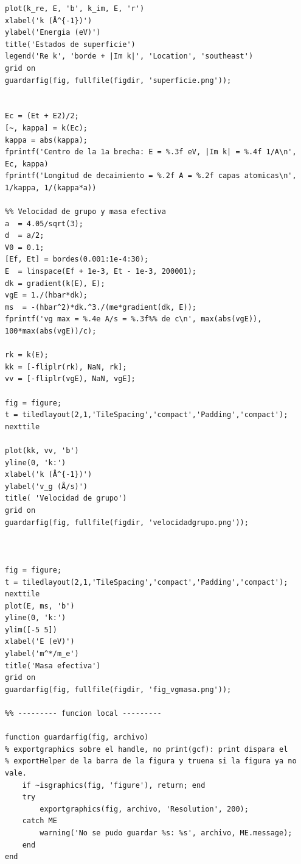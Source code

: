 \documentclass[reprint, amsmath, amssymb, aps, prb]{revtex4-2}
\begin{document}
\begin{appendices}
\begin{lstlisting}
plot(k_re, E, 'b', k_im, E, 'r')
xlabel('k (Å^{-1})')
ylabel('Energia (eV)')
title('Estados de superficie')
legend('Re k', 'borde + |Im k|', 'Location', 'southeast')
grid on
guardarfig(fig, fullfile(figdir, 'superficie.png'));


Ec = (Et + E2)/2;
[~, kappa] = k(Ec);
kappa = abs(kappa);
fprintf('Centro de la 1a brecha: E = %.3f eV, |Im k| = %.4f 1/A\n', Ec, kappa)
fprintf('Longitud de decaimiento = %.2f A = %.2f capas atomicas\n', 1/kappa, 1/(kappa*a))

%% Velocidad de grupo y masa efectiva
a  = 4.05/sqrt(3);
d  = a/2;
V0 = 0.1;
[Ef, Et] = bordes(0.001:1e-4:30);
E  = linspace(Ef + 1e-3, Et - 1e-3, 200001);
dk = gradient(k(E), E);
vgE = 1./(hbar*dk);
ms  = -(hbar^2)*dk.^3./(me*gradient(dk, E));
fprintf('vg max = %.4e A/s = %.3f%% de c\n', max(abs(vgE)), 100*max(abs(vgE))/c);

rk = k(E);
kk = [-fliplr(rk), NaN, rk];
vv = [-fliplr(vgE), NaN, vgE];

fig = figure;
t = tiledlayout(2,1,'TileSpacing','compact','Padding','compact');
nexttile

plot(kk, vv, 'b')
yline(0, 'k:')
xlabel('k (Å^{-1})')
ylabel('v_g (Å/s)')
title( 'Velocidad de grupo')
grid on
guardarfig(fig, fullfile(figdir, 'velocidadgrupo.png'));



fig = figure;
t = tiledlayout(2,1,'TileSpacing','compact','Padding','compact');
nexttile
plot(E, ms, 'b')
yline(0, 'k:')
ylim([-5 5])
xlabel('E (eV)')
ylabel('m^*/m_e')
title('Masa efectiva')
grid on
guardarfig(fig, fullfile(figdir, 'fig_vgmasa.png'));

%% --------- funcion local ---------

function guardarfig(fig, archivo)
% exportgraphics sobre el handle, no print(gcf): print dispara el
% exportHelper de la barra de la figura y truena si la figura ya no vale.
    if ~isgraphics(fig, 'figure'), return; end
    try
        exportgraphics(fig, archivo, 'Resolution', 200);
    catch ME
        warning('No se pudo guardar %s: %s', archivo, ME.message);
    end
end

\end{lstlisting}
\end{appendices}
\end{document}
